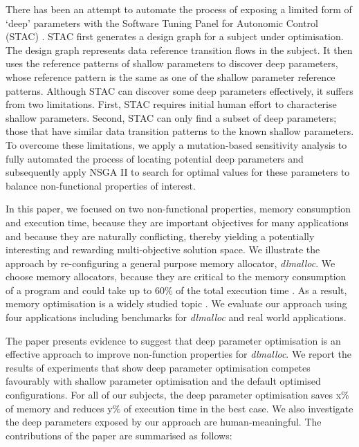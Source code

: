 There has been an attempt to automate the process of exposing a limited form of `deep' parameters with the Software Tuning Panel for Autonomic Control (STAC) \cite{Brake:2008:ADS:1370018.1370031}. STAC first generates a design graph for a subject under optimisation. The design graph represents data reference transition flows in the subject. It then uses the reference patterns of shallow parameters to discover deep parameters, whose reference pattern is the same as one of the shallow parameter reference patterns. Although STAC can discover some deep parameters effectively, it suffers from two limitations. First, STAC requires initial human effort to characterise shallow parameters. Second, STAC can only find a subset of deep parameters; those that have similar data transition patterns to the known shallow parameters. To overcome these limitations, we apply a mutation-based sensitivity analysis to fully automated the process of locating potential deep parameters and subsequently apply NSGA II to search for optimal values for these parameters to balance non-functional properties of interest. 

In this paper, we focused on two non-functional properties, memory consumption and execution time, because they are important objectives for many applications and because they are naturally conflicting, thereby yielding a potentially interesting and rewarding multi-objective solution space. We illustrate the approach by re-configuring a general purpose memory allocator, \emph{dlmalloc}. We choose memory allocators, because they are critical to the memory consumption of a program and could take up to 60\% of the total execution time \cite{Zorn:1992:EMS:142181.142200}. As a result, memory optimisation is a widely studied topic \cite{Risco-Martin:2009:ODM:1569901.1570116,RiscoMartin2010572}. We evaluate our approach using four applications including benchmarks for \emph{dlmalloc} and real world applications.

The paper presents evidence to suggest that deep parameter optimisation is an effective approach to improve non-function properties for \emph{dlmalloc}. 
We report the results of experiments that show deep parameter optimisation competes favourably with shallow parameter optimisation and the default optimised configurations. For all of our subjects, the deep parameter optimisation saves x\% of memory and reduces y\% of execution time in the best case. We also investigate the deep parameters exposed by our approach are human-meaningful. The contributions of the paper are summarised as follows:


